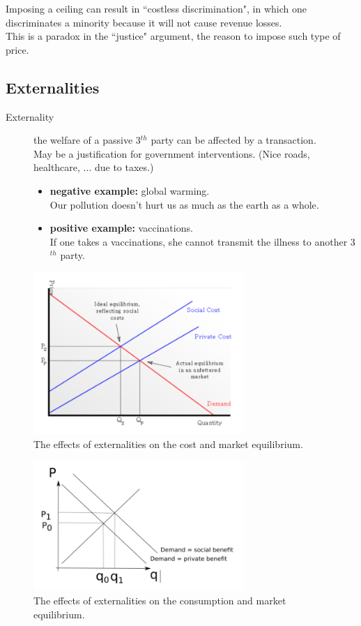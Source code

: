 \documentclass[12pt, a4paper, titlepage]{extarticle}
\begin{document}
	Imposing a ceiling can result in ``costless discrimination", in which one discriminates a minority because it will not cause revenue losses.\\
	This is a paradox in the ``justice" argument, the reason to impose such type of price.
	
	\subsection{Externalities}
	\begin{description}
		\item[Externality] the welfare of a passive 3$^{th}$ party can be affected by a transaction.\\
		May be a justification for government interventions. (Nice roads, healthcare, ... due to taxes.)
		\begin{itemize}
			\item \textbf{negative example:} global warming.\\
			Our pollution doesn't hurt us as much as the earth as a whole.\\
			\item \textbf{positive example:} vaccinations.\\
			If one takes a vaccinations, she cannot transmit the illness to another 3$^{th}$ party.\\
		\end{itemize}
	\end{description}
	\begin{figure}[h]
	\centering
		\includegraphics[width=8cm]{Externalities}
		\caption{The effects of externalities on the cost and market equilibrium. \label{imgEffectsOnProductionCostExternalities}}
	\end{figure}
	\begin{figure}[h]
	\centering
		\includegraphics[width=8cm]{ConsumptionExternalities}
		\caption{The effects of externalities on the consumption and market equilibrium. \label{imgEffectsOnConsumptionExternalities}}
	\end{figure}
	
\end{document}
